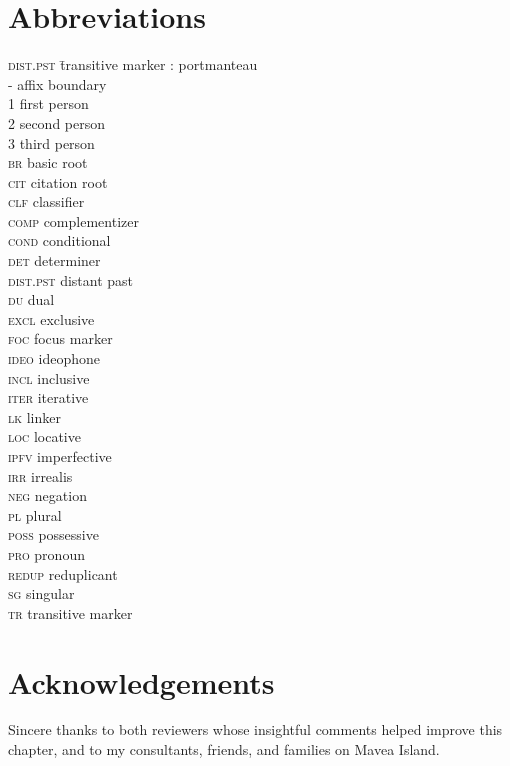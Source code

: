 \documentclass[output=paper]{LSP/langsci}
\begin{document}
\section*{Abbreviations}
\begin{multicols}{3}
\begin{tabbing}
\textsc{dist.pst} \= transitive marker\kill
\textsc{:} \> portmanteau\\
\textsc{-} \> affix boundary\\
\textsc{1} \>	first person\\
\textsc{2} \>	second person\\
\textsc{3} \> third person\\
\textsc{br} \>	basic root\\
\textsc{cit} \>	citation root\\
\textsc{clf} \>	classifier\\
\textsc{comp} \>	complementizer\\
\textsc{cond} \>	conditional\\
\textsc{det} \>	determiner\\
\textsc{dist.pst} \>	distant past\\
\textsc{du} \>	dual\\
\textsc{excl} \>	exclusive\\
\textsc{foc} \>	focus marker\\
\textsc{ideo} \>	ideophone\\
\textsc{incl} \>	inclusive\\
\textsc{iter} \>	iterative\\
\textsc{lk} \>	linker\\
\textsc{loc} \>	locative\\
\textsc{ipfv} \>	imperfective\\
\textsc{irr} \>  irrealis\\
\textsc{neg} \>  negation\\
\textsc{pl}  \> plural\\
\textsc{poss} \>  possessive\\
\textsc{pro}  \> pronoun\\
\textsc{redup} \> reduplicant\\
\textsc{sg} \> singular\\
\textsc{tr} \> transitive marker\\
\end{tabbing}
\end{multicols}



\section*{Acknowledgements}
Sincere thanks to both reviewers whose insightful comments helped improve this chapter, and to my consultants, friends, and families on Mavea Island.
\sloppy

\printbibliography[heading=subbibliography,notkeyword=this] 
\end{document}

